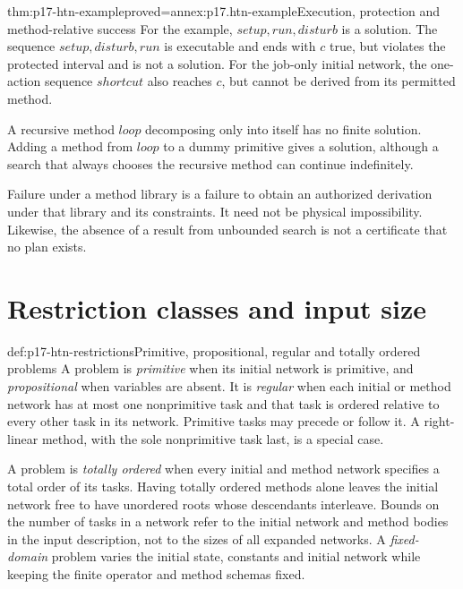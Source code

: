 \begin{hbtheorem}{thm:p17-htn-example}{proved=annex:p17.htn-example}{Execution, protection and method-relative success}
For the example, \(\mathit{setup},\mathit{run},\mathit{disturb}\) is a
solution. The sequence \(\mathit{setup},\mathit{disturb},\mathit{run}\)
is executable and ends with \(c\) true, but violates the protected interval
and is not a solution. For the job-only initial network, the one-action
sequence \(\mathit{shortcut}\) also reaches \(c\), but cannot be derived
from its permitted method.

A recursive method \(\mathit{loop}\) decomposing only into itself has no
finite solution. Adding a method from \(\mathit{loop}\) to a dummy primitive
gives a solution, although a search that always chooses the recursive method
can continue indefinitely.
\end{hbtheorem}

Failure under a method library is a failure to obtain an authorized derivation
under that library and its constraints. It need not be physical impossibility.
Likewise, the absence of a result from unbounded search is not a certificate
that no plan exists.

\section{Restriction classes and input size}
\label{sec:p17-htn-restrictions}

\begin{hbdefinition}{def:p17-htn-restrictions}{Primitive, propositional, regular and totally ordered problems}
A problem is \emph{primitive} when its initial network is primitive, and
\emph{propositional} when variables are absent. It is \emph{regular} when
each initial or method network has at most one nonprimitive task and that task
is ordered relative to every other task in its network. Primitive tasks may
precede or follow it. A right-linear method, with the sole nonprimitive task
last, is a special case.

A problem is \emph{totally ordered} when every initial and method network
specifies a total order of its tasks. Having totally ordered methods alone leaves the initial
network free to have unordered roots whose descendants interleave.
Bounds on the number of tasks in a network refer to the initial network and
method bodies in the input description, not to the sizes of all expanded
networks. A \emph{fixed-domain} problem varies the initial state, constants
and initial network while keeping the finite operator and method schemas fixed.
\end{hbdefinition}

